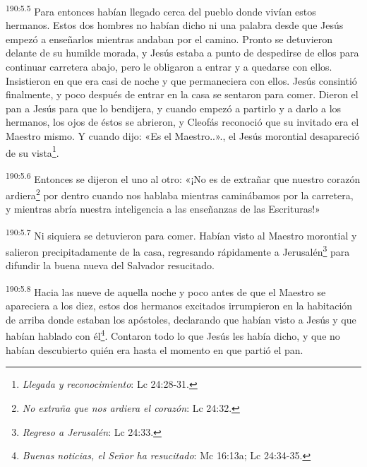 \par 
\textsuperscript{190:5.5} Para entonces habían llegado cerca del pueblo donde vivían estos hermanos. Estos dos hombres no habían dicho ni una palabra desde que Jesús empezó a enseñarlos mientras andaban por el camino. Pronto se detuvieron delante de su humilde morada, y Jesús estaba a punto de despedirse de ellos para continuar carretera abajo, pero le obligaron a entrar y a quedarse con ellos. Insistieron en que era casi de noche y que permaneciera con ellos. Jesús consintió finalmente, y poco después de entrar en la casa se sentaron para comer. Dieron el pan a Jesús para que lo bendijera, y cuando empezó a partirlo y a darlo a los hermanos, los ojos de éstos se abrieron, y Cleofás reconoció que su invitado era el Maestro mismo. Y cuando dijo: «Es el Maestro..»., el Jesús morontial desapareció de su vista\footnote{\textit{Llegada y reconocimiento}: Lc 24:28-31.}.

\par 
\textsuperscript{190:5.6} Entonces se dijeron el uno al otro: «¡No es de extrañar que nuestro corazón ardiera\footnote{\textit{No extraña que nos ardiera el corazón}: Lc 24:32.} por dentro cuando nos hablaba mientras caminábamos por la carretera, y mientras abría nuestra inteligencia a las enseñanzas de las Escrituras!»

\par 
\textsuperscript{190:5.7} Ni siquiera se detuvieron para comer. Habían visto al Maestro morontial y salieron precipitadamente de la casa, regresando rápidamente a Jerusalén\footnote{\textit{Regreso a Jerusalén}: Lc 24:33.} para difundir la buena nueva del Salvador resucitado.

\par 
\textsuperscript{190:5.8} Hacia las nueve de aquella noche y poco antes de que el Maestro se apareciera a los diez, estos dos hermanos excitados irrumpieron en la habitación de arriba donde estaban los apóstoles, declarando que habían visto a Jesús y que habían hablado con él\footnote{\textit{Buenas noticias, el Señor ha resucitado}: Mc 16:13a; Lc 24:34-35.}. Contaron todo lo que Jesús les había dicho, y que no habían descubierto quién era hasta el momento en que partió el pan.